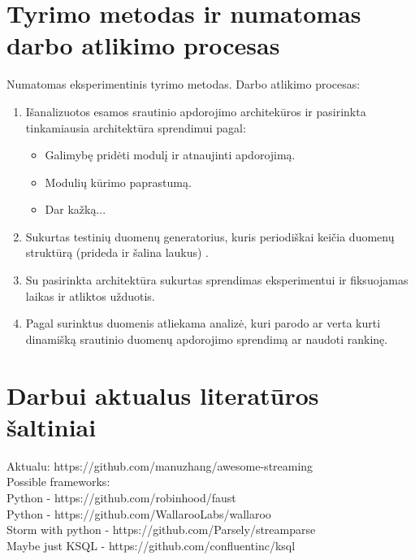 \documentclass{VUMIFPSbakalaurinis}
\begin{document}
\section{Tyrimo metodas ir numatomas darbo atlikimo procesas}
Numatomas eksperimentinis tyrimo metodas.
Darbo atlikimo procesas:
\begin{enumerate}
    \item Išanalizuotos esamos srautinio apdorojimo architekūros ir pasirinkta tinkamiausia architektūra sprendimui pagal:
    	\begin{itemize}
		\item Galimybę pridėti modulį ir atnaujinti apdorojimą.
		\item Modulių kūrimo paprastumą.
		\item Dar kažką...
	\end{itemize}
    \item Sukurtas testinių duomenų generatorius, kuris periodiškai keičia duomenų struktūrą (prideda ir šalina laukus) .
    \item Su pasirinkta architektūra sukurtas sprendimas eksperimentui ir fiksuojamas laikas ir atliktos užduotis.
    \item Pagal surinktus duomenis atliekama analizė, kuri parodo ar verta kurti dinamišką srautinio duomenų apdorojimo sprendimą 
    ar naudoti rankinę.  
\end{enumerate}

\section{Darbui aktualus literatūros šaltiniai}
Aktualu: https://github.com/manuzhang/awesome-streaming \\
Possible frameworks: \\
 Python - https://github.com/robinhood/faust \\
 Python - https://github.com/WallarooLabs/wallaroo \\
 Storm with python - https://github.com/Parsely/streamparse \\
 Maybe just KSQL - https://github.com/confluentinc/ksql \\
 
\end{document}
